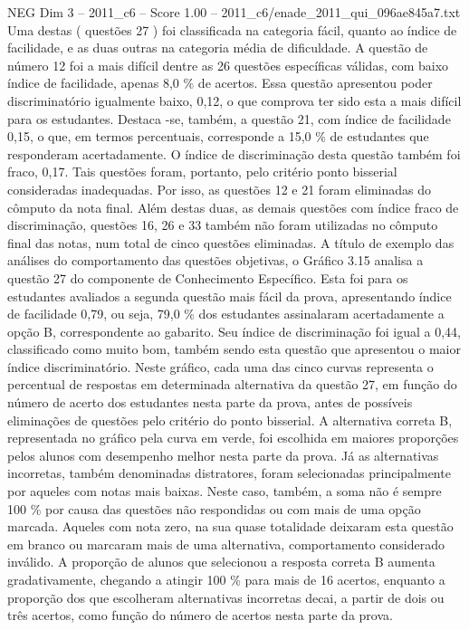\begin{textsample}{NEG Dim 3 – 2011\_c6 – Score 1.00 – 2011\_c6/enade\_2011\_qui\_096ae845a7.txt}
Uma destas ( questões 27 ) foi classificada na categoria fácil, quanto ao índice de facilidade, e as duas outras na categoria média de dificuldade.
A questão de número 12 foi a mais difícil dentre as 26 questões específicas válidas, com baixo índice de facilidade, apenas 8,0 \% de acertos.
Essa questão apresentou poder discriminatório igualmente baixo, 0,12, o que comprova ter sido esta a mais difícil para os estudantes.
Destaca -se, também, a questão 21, com índice de facilidade 0,15, o que, em termos percentuais, corresponde a 15,0 \% de estudantes que responderam acertadamente.
O índice de discriminação desta questão também foi fraco, 0,17.
Tais questões foram, portanto, pelo critério ponto bisserial consideradas inadequadas.
Por isso, as questões 12 e 21 foram eliminadas do cômputo da nota final.
Além destas duas, as demais questões com índice fraco de discriminação, questões 16, 26 e 33 também não foram utilizadas no cômputo final das notas, num total de cinco questões eliminadas.
A título de exemplo das análises do comportamento das questões objetivas, o Gráfico 3.15 analisa a questão 27 do componente de Conhecimento Específico.
Esta foi para os estudantes avaliados a segunda questão mais fácil da prova, apresentando índice de facilidade 0,79, ou seja, 79,0 \% dos estudantes assinalaram acertadamente a opção B, correspondente ao gabarito.
Seu índice de discriminação foi igual a 0,44, classificado como muito bom, também sendo esta questão que apresentou o maior índice discriminatório.
Neste gráfico, cada uma das cinco curvas representa o percentual de respostas em determinada alternativa da questão 27, em função do número de acerto dos estudantes nesta parte da prova, antes de possíveis eliminações de questões pelo critério do ponto bisserial.
A alternativa correta B, representada no gráfico pela curva em verde, foi escolhida em maiores proporções pelos alunos com desempenho melhor nesta parte da prova.
Já as alternativas incorretas, também denominadas distratores, foram selecionadas principalmente por aqueles com notas mais baixas.
Neste caso, também, a soma não é sempre 100 \% por causa das questões não respondidas ou com mais de uma opção marcada.
Aqueles com nota zero, na sua quase totalidade deixaram esta questão em branco ou marcaram mais de uma alternativa, comportamento considerado inválido.
A proporção de alunos que selecionou a resposta correta B aumenta gradativamente, chegando a atingir 100 \% para mais de 16 acertos, enquanto a proporção dos que escolheram alternativas incorretas decai, a partir de dois ou três acertos, como função do número de acertos nesta parte da prova.

\end{textsample}
